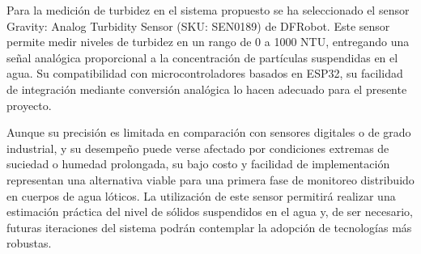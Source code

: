 Para la medición de turbidez en el sistema propuesto se ha seleccionado el sensor Gravity: Analog Turbidity Sensor (SKU: SEN0189) de DFRobot. Este sensor permite medir niveles de turbidez en un rango de 0 a 1000 NTU, entregando una señal analógica proporcional a la concentración de partículas suspendidas en el agua. Su compatibilidad con microcontroladores basados en ESP32, su facilidad de integración mediante conversión analógica lo hacen adecuado para el presente proyecto.

Aunque su precisión es limitada en comparación con sensores digitales o de grado industrial, y su desempeño puede verse afectado por condiciones extremas de suciedad o humedad prolongada, su bajo costo y facilidad de implementación representan una alternativa viable para una primera fase de monitoreo distribuido en cuerpos de agua lóticos. La utilización de este sensor permitirá realizar una estimación práctica del nivel de sólidos suspendidos en el agua y, de ser necesario, futuras iteraciones del sistema podrán contemplar la adopción de tecnologías más robustas.


